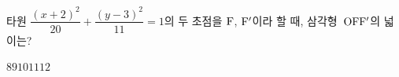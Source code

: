 타원 $\dfrac{(x+2)^2}{20}+\dfrac{(y-3)^2}{11}=1$의 두 초점을 $\mathrm{F}$, $\mathrm{F}'$이라 할 때, 삼각형~$\mathrm{OFF'}$의 넓이는? 
\begin{choices32}{$8$}{$9$}{$10$}{$11$}{$12$}\end{choices32}
